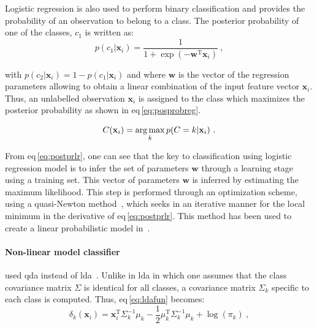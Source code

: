 
Logistic regression is also used to perform binary classification and provides the probability of an observation to belong to a class.
The posterior probability of one of the classes, $c_1$ is written as:
\begin{equation}
	p(c_1|\mathbf{x}_i) = \frac{1}{1+\exp(-\mathbf{w}^{\text{T}}\mathbf{x}_i)} \ ,
	\label{eq:postprlr}
\end{equation}

\noindent with $p(c_2|\mathbf{x}_i) = 1 - p(c_1|\mathbf{x}_i)$ and where $\mathbf{w}$ is the vector of the regression parameters allowing to obtain a linear combination of the input feature vector $\mathbf{x}_i$.
Thus, an unlabelled observation $\mathbf{x}_i$ is assigned to the class which maximizes the posterior probability as shown in \acs{eq}\,\eqref{eq:posprobreg}.

\begin{equation}
	C(\mathbf{x}_i) = \operatorname*{arg\,max}_k p(C=k|\mathbf{x}_i) \ .
	\label{eq:posprobreg}
\end{equation}

From \acs{eq}\,\eqref{eq:postprlr}, one can see that the key to classification using logistic regression model is to infer the set of parameters $\mathbf{w}$ through a learning stage using a training set.
This vector of parameters $\mathbf{w}$ is inferred by estimating the maximum likelihood.
This step is performed through an optimization scheme, using a quasi-Newton method~\cite{Byrd1995}, which seeks in an iterative manner for the local minimum in the derivative of \acs{eq}\,\eqref{eq:postprlr}.
This method has been used to create a linear probabilistic model in~\cite{Kelm2007,Puech2009,lehaire2014computer,rampun2015computer}.

\paragraph{Non-linear model classifier}
\citeauthor{Viswanath2012} used \acf{qda} instead of \ac{lda}~\cite{Viswanath2012}.
Unlike in \ac{lda} in which one assumes that the class covariance matrix $\Sigma$ is identical for all classes, a covariance matrix $\Sigma_k$ specific to each class is computed.
Thus, \acs{eq}\,\eqref{eq:ldafun} becomes:
\begin{equation}
	\delta_{k}(\mathbf{x}_i) = \mathbf{x}_i^{\text{T}} \Sigma_{k}^{-1} \mu_k - \frac{1}{2} \mu_{k}^{\text{T}} \Sigma_{k}^{-1} \mu_k + \log (\pi_k) \ ,
	\label{eq:qdafun}
\end{equation}

